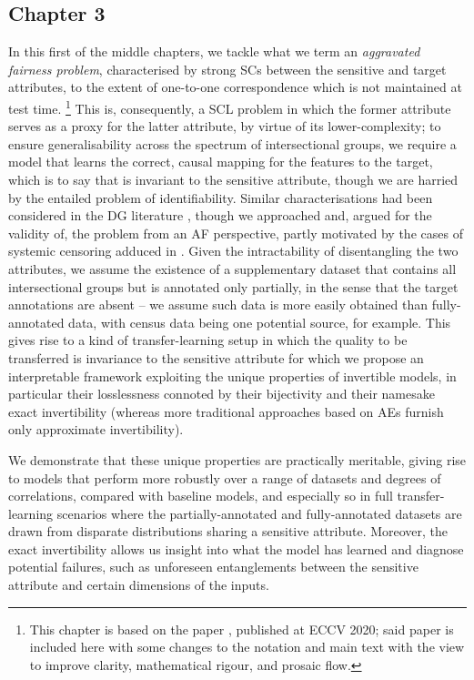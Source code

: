 \subsection*{Chapter 3}%
%
In this first of the middle chapters, we tackle what we term an \emph{aggravated fairness problem},
characterised by strong \acp{SC} between the sensitive and target attributes, to the extent of
one-to-one correspondence which is not maintained at test time.
%
\footnote{
    This chapter is based on the paper \citet{kehrenberg2020nullsampling}, published at ECCV 2020;
    said paper is included here with some changes to the notation and main text with the view to
    improve clarity, mathematical rigour, and prosaic flow.
}
%
This is, consequently, a \ac{SCL} problem in which the former attribute serves as a proxy
for the latter attribute, by virtue of its lower-complexity; to ensure generalisability across the
spectrum of intersectional groups, we require a model that learns the correct, causal mapping for
the features to the target, which is to say that is invariant to the sensitive attribute, though we
are harried by the entailed problem of identifiability.
%
Similar characterisations had been considered in the \ac{DG} literature
\citep{arjovsky2019invariant, jacobsen2019excessive}, though we approached and, argued for the
validity of, the problem from an \ac{AF} perspective, partly motivated by the cases of systemic
censoring adduced in \citet{kallus2018residual}.
%
Given the intractability of disentangling the two attributes, we assume the existence of a
supplementary dataset that contains all intersectional groups but is annotated only partially, in
the sense that the target annotations are absent -- we assume such data is more easily obtained
than fully-annotated data, with census data being one potential source, for example.
%
This gives rise to a kind of transfer-learning setup in which the quality to be transferred is
invariance to the sensitive attribute for which we propose an interpretable framework exploiting
the unique properties of invertible models, in particular their losslessness connoted by their
bijectivity and their namesake exact invertibility (whereas more traditional approaches based on
\acp{AE} furnish only approximate invertibility).
%

We demonstrate that these unique properties are practically meritable, giving rise to models that
perform more robustly over a range of datasets and degrees of correlations, compared with baseline
models, and especially so in full transfer-learning scenarios where the partially-annotated and
fully-annotated datasets are drawn from disparate distributions sharing a sensitive attribute.
%
Moreover, the exact invertibility allows us insight into what the model has learned and diagnose
potential failures, such as unforeseen entanglements between the sensitive attribute and certain
dimensions of the inputs.
%
